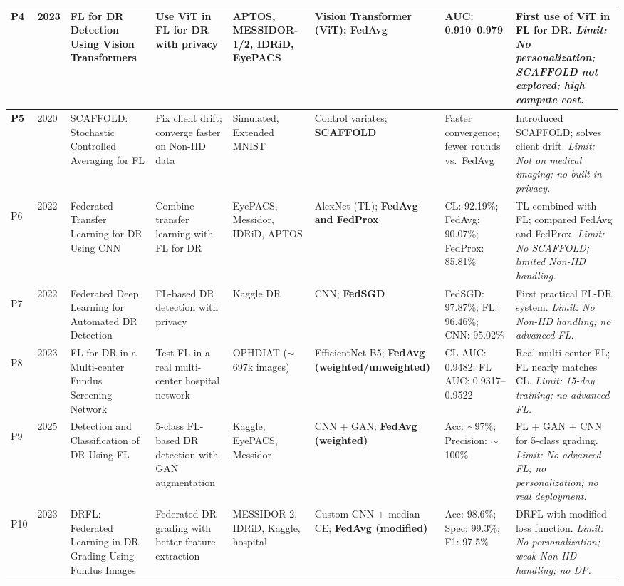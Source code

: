 \documentclass[12pt, a4paper]{article}
\begin{document}
\begin{landscape}
\begin{scriptsize}
\begin{longtable}{|>{\centering\bfseries}p{0.5cm}|p{0.6cm}|p{3.0cm}|p{2.5cm}|p{1.9cm}|p{2.8cm}|p{1.8cm}|p{3.4cm}|}
P4 & 2023 &
FL for DR Detection Using Vision Transformers &
Use ViT in FL for DR with privacy &
APTOS, MESSIDOR-1/2, IDRiD, EyePACS &
Vision Transformer (ViT); \textbf{FedAvg} &
AUC: 0.910--0.979 &
First use of ViT in FL for DR. \textit{Limit: No personalization; SCAFFOLD not explored; high compute cost.} \\
\hline

P5 & 2020 &
SCAFFOLD: Stochastic Controlled Averaging for FL &
Fix client drift; converge faster on Non-IID data &
Simulated, Extended MNIST &
Control variates; \textbf{SCAFFOLD} &
Faster convergence; fewer rounds vs.\ FedAvg &
Introduced SCAFFOLD; solves client drift. \textit{Limit: Not on medical imaging; no built-in privacy.} \\
\hline

P6 & 2022 &
Federated Transfer Learning for DR Using CNN &
Combine transfer learning with FL for DR &
EyePACS, Messidor, IDRiD, APTOS &
AlexNet (TL); \textbf{FedAvg and FedProx} &
CL: 92.19\%; FedAvg: 90.07\%; FedProx: 85.81\% &
TL combined with FL; compared FedAvg and FedProx. \textit{Limit: No SCAFFOLD; limited Non-IID handling.} \\
\hline

P7 & 2022 &
Federated Deep Learning for Automated DR Detection &
FL-based DR detection with privacy &
Kaggle DR &
CNN; \textbf{FedSGD} &
FedSGD: 97.87\%; FL: 96.46\%; CNN: 95.02\% &
First practical FL-DR system. \textit{Limit: No Non-IID handling; no advanced FL.} \\
\hline

P8 & 2023 &
FL for DR in a Multi-center Fundus Screening Network &
Test FL in a real multi-center hospital network &
OPHDIAT ($\sim$697k images) &
EfficientNet-B5; \textbf{FedAvg (weighted/unweighted)} &
CL AUC: 0.9482; FL AUC: 0.9317--0.9522 &
Real multi-center FL; FL nearly matches CL. \textit{Limit: 15-day training; no advanced FL.} \\
\hline

P9 & 2025 &
Detection and Classification of DR Using FL &
5-class FL-based DR detection with GAN augmentation &
Kaggle, EyePACS, Messidor &
CNN + GAN; \textbf{FedAvg (weighted)} &
Acc: $\sim$97\%; Precision: $\sim$100\% &
FL + GAN + CNN for 5-class grading. \textit{Limit: No advanced FL; no personalization; no real deployment.} \\
\hline

P10 & 2023 &
DRFL: Federated Learning in DR Grading Using Fundus Images &
Federated DR grading with better feature extraction &
MESSIDOR-2, IDRiD, Kaggle, hospital &
Custom CNN + median CE; \textbf{FedAvg (modified)} &
Acc: 98.6\%; Spec: 99.3\%; F1: 97.5\% &
DRFL with modified loss function. \textit{Limit: No personalization; weak Non-IID handling; no DP.} \\
\hline


\end{longtable}
\end{scriptsize}
\end{landscape}
\end{document}
